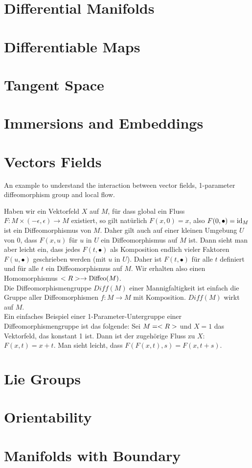 \section{Differential Manifolds}
\section{Differentiable Maps}
\section{Tangent Space}
\section{Immersions and Embeddings}
\section{Vectors Fields}
An example to understand the interaction between vector fields, 1-parameter diffeomorphism group and local flow.
\begin{*example}
	Haben wir ein Vektorfeld $X$ auf $M$, für dass global ein Fluss $F:M \times (-\epsilon,\epsilon)\to M$ existiert, so gilt natürlich $F(x,0)=x$, also $F(0,\bullet)=\operatorname{id}_M$ ist ein Diffeomorphismus von $M$. Daher gilt auch auf einer kleinen Umgebung $U$ von 0, dass $F(x,u)$ für $u$ in $U$ ein Diffeomorphismus auf $M$ ist. Dann sieht man aber leicht ein, dass jedes $F(t,\bullet)$ als Komposition endlich vieler Faktoren $F(u,\bullet)$ geschrieben werden (mit $u$ in $U$). Daher ist $F(t,\bullet)$ für alle $t$ definiert und für alle $t$ ein Diffeomorphismus auf $M$. Wir erhalten also einen Homomorphismus $<R>\to\operatorname{Diffeo}(M)$.\\
	Die Diffeomorphismengruppe $Diff(M)$ einer Mannigfaltigkeit ist einfach die Gruppe aller Diffeomorphismen $f\colon M\to M$ mit Komposition. $Diff(M)$ wirkt auf $M$.\\
	Ein einfaches Beispiel einer 1-Parameter-Untergruppe einer Diffeomorphismengruppe ist das folgende: Sei $M=<R>$ und $X=1$ das Vektorfeld, das konstant 1 ist. Dann ist der zugehörige Fluss zu $X$: $F(x,t)=x+t$. Man sieht leicht, dass $F(F(x,t),s)=F(x,t+s)$.
\end{*example}
\section{Lie Groups}
\section{Orientability}
\section{Manifolds with Boundary}
